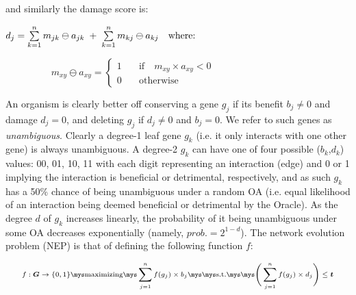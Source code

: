 \vspace{.5cm}
and similarly the damage score is:
\vspace{.5cm}

$d_j = \sum\limits_{k=1}^{n} m_{jk} \ominus a_{jk} \hspace{0.1cm}+\hspace{0.1cm} \sum\limits_{k=1}^{n} m_{kj} \ominus a_{kj} \quad\textrm{where:}$ 

$\hspace{2cm}m_{xy} \ominus a_{xy}  = \scriptscriptstyle{\begin{cases}	%
											1 & \quad\textrm{if}\quad m_{xy} \times a_{xy} < 0 \\
											0 & \quad\textrm{otherwise} 
									\end{cases}	
									}$

\vspace{.5cm}
An organism is clearly better off conserving a gene $g_j$ if its benefit $b_j\neq 0$  and damage $d_j=0$,
and deleting $g_j$ if $d_j\neq 0$ and $b_j=0$. We refer to such genes as \textit{unambiguous}. 
Clearly a degree-1 leaf gene $g_k$ (i.e. it only interacts with one other gene) is always 
unambiguous. A degree-2 $g_k$ can have one of four possible ($b_k$,$d_k$) values: 00, 01, 10, 11 with each digit representing an 
interaction (edge) and 0 or 1 implying the interaction is beneficial or detrimental, respectively, and as such $g_k$ has a 50\%
chance of being unambiguous under a random OA (i.e. equal likelihood of an interaction being deemed beneficial or detrimental by the Oracle).
As the degree $d$ of $g_k$ increases linearly, the probability of it being unambiguous under some OA decreases exponentially (namely,  $prob. = 2^{1-d}$). The network evolution problem (NEP) is that of defining the following function $f$: 

\begin{align*}
\scriptsize {f:\boldsymbol{G}  \rightarrow \{0,1\} \mys \textrm{maximizing} \mys  \sum\limits_{j=1}^{n} f(g_j)\times b_j \mys\mys\textrm{s.t.} \mys\mys \Bigg(  \sum\limits_{j=1}^{n} f(g_j)\times d_j  \Bigg)  \leq \boldsymbol{t} }
\end{align*}

